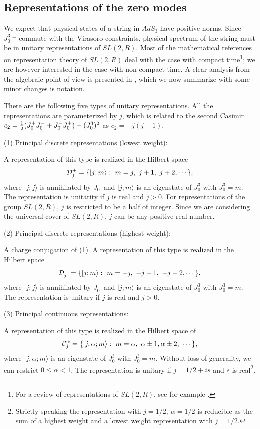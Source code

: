 \subsection{Representations of the zero modes}

We expect that physical states of a string in $AdS_3$
 have positive norms. Since $J_0^{3,\pm}$ commute with 
the Virasoro constraints, physical spectrum of the string
must be in unitary representations of $SL(2,R)$.
Most of the mathematical references on representation theory 
of $SL(2,R)$ deal with the case with compact time\footnote{For 
a review of  representations of $SL(2,R)$,
see for example \cite{sugiura}.};
 we are however interested in 
the case with non-compact time. A clear analysis from the algebraic
point of view is presented in \cite{Dixon:1989cg}, which we now 
summarize with some minor changes is notation.

There are the following five types of unitary 
representations.
All the representations are parameterized by $j$,
which is related to the second Casimir
$c_2 =  {1 \over 2}(J_0^+ J_0^- + J_0^- J_0^+) - (J_0^3)^2$
as $c_2 = - j(j-1)$. 

\medskip
 
\noindent 
(1) Principal discrete representations (lowest weight):

A representation of this type is realized in
the Hilbert space $${\cal D}_j^+= \{
|j; m\rangle :~ m=j, ~j+1, ~j+2, \cdots \},$$
where $|j; j \rangle$ is annihilated by $J_0^-$
and $|j; m \rangle$ is an eigenstate of $J_0^3$
with $J_0^3 = m$.
The representation is unitarity if $j$ is real and $j > 0$.
For representations of the group 
$SL(2,R)$, $j$ is restricted to be a half of integer. 
Since we are considering the universal cover of $SL(2,R)$,
$j$ can be any positive real number. 

\smallskip

\noindent
(2) Principal discrete representations (highest weight):

A charge conjugation of (1). 
A representation of this type is realized in
the Hilbert space $${\cal D}_j^-= \{
|j; m\rangle :~ m= -j, ~-j-1, ~-j-2, \cdots \},$$
where $|j; j\rangle$ is annihilated by $J_0^+$
and $|j; m \rangle$ is an eigenstate of $J_0^3$
with $J_0^3 = m$. 
The representation is unitary if $j$ is real and $j > 0$. 

\smallskip

\noindent
(3) Principal continuous representations:

A representation of this type is realized
in the Hilbert space of $${\cal C}_j^{\alpha}
= \{  |j ,\alpha; m \rangle :~m = \alpha,~ \alpha \pm 1, 
\alpha \pm 2,~ \cdots \},$$
where $|j,\alpha; m \rangle$ is an eigenstate
of $J_0^3$ with $J_0^3=m$. 
Without loss of generality,
we can restrict $0 \leq \alpha < 1$. 
The representation is unitary if $j = 1/2 + i s$
and $s$ is real\footnote{Strictly speaking the representation with
$j=1/2, ~\alpha=1/2$ is  reducible as the sum of a highest weight and
a lowest weight representation with $j=1/2$.}. 

